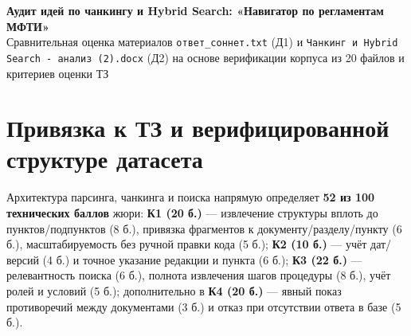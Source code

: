 \documentclass[10pt,a4paper]{article}
\begin{document}
\small
\begin{center}
    {\Large\bfseries\sffamily\color{HeaderBg} Аудит идей по чанкингу и Hybrid Search: «Навигатор по регламентам МФТИ»}\\[2pt]
    {\small Сравнительная оценка материалов \texttt{ответ\_соннет.txt} (Д1) и \texttt{Чанкинг и Hybrid Search - анализ (2).docx} (Д2) на основе верификации корпуса из 20 файлов и критериев оценки ТЗ}
\end{center}
\vspace{-6pt}

\section{Привязка к ТЗ и верифицированной структуре датасета}
Архитектура парсинга, чанкинга и поиска напрямую определяет \textbf{52 из 100 технических баллов} жюри:
\textbf{К1 (20 б.)} — извлечение структуры вплоть до пунктов/подпунктов (8 б.), привязка фрагментов к документу/разделу/пункту (6 б.), масштабируемость без ручной правки кода (5 б.);
\textbf{К2 (10 б.)} — учёт дат/версий (4 б.) и точное указание редакции и пункта (6 б.);
\textbf{К3 (22 б.)} — релевантность поиска (6 б.), полнота извлечения шагов процедуры (8 б.), учёт ролей и условий (5 б.);
дополнительно в \textbf{К4 (20 б.)} — явный показ противоречий между документами (3 б.) и отказ при отсутствии ответа в базе (5 б.).
\end{document}
